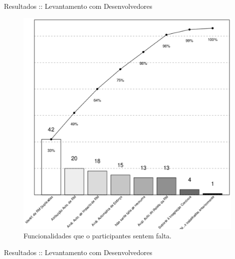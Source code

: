 \documentclass[t,14pt,mathserif]{beamer}
\begin{document}
\begin{frame}{Resultados :: Levantamento com Desenvolvedores}

\begin{figure}[htpb]
	\centering
	\includegraphics[width=0.5\linewidth]{../img/grafico_melhorias_fgrm_funcionalidades_faltantes.eps}
	\caption{Funcionalidades que o participantes sentem falta.}
\label{fig:grafico_melhorias_fgrm_funcionalidades_falantes}
\end{figure}

\end{frame}

\begin{frame}{Resultados :: Levantamento com Desenvolvedores}


\begin{table}[htpb]
\centering
{}
\caption{Classificação das funcionalidades que possam dar suporte ao uso das
metodologias dos agilistas.}
\label{tab:melhorias_fgrm_suporte_particas_ageis}

\end{table}

\end{frame}
\end{document}

